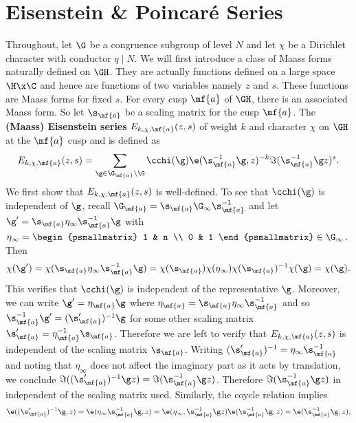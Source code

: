   \section{Eisenstein \& Poincar\'e Series}
    Throughout, let $\G$ be a congruence subgroup of level $N$ and let $\chi$ be a Dirichlet character with conductor $q \mid N$. We will first introduce a class of Maass forms naturally defined on $\GH$. They are actually functions defined on a large space $\H \x \C$ and hence are functions of two variables namely $z$ and $s$. These functions are Maass forms for fixed $s$. For every cusp $\mf{a}$ of $\GH$, there is an associated Maass form. So let $\s_{\mf{a}}$ be a scaling matrix for the cusp $\mf{a}$. The \textbf{(Maass) Eisenstein series} $E_{k,\chi,\mf{a}}(z,s)$ of weight $k$ and character $\chi$ on $\GH$ at the $\mf{a}$ cusp and is defined as
    \[
      E_{k,\chi,\mf{a}}(z,s) = \sum_{\g \in \G_{\mf{a}}\backslash\G}\cchi(\g)\e(\s_{\mf{a}}^{-1}\g,z)^{-k}\Im(\s_{\mf{a}}^{-1}\g z)^{s}.
    \]
    We first show that $E_{k,\chi,\mf{a}}(z,s)$ is well-defined. To see that $\cchi(\g)$ is independent of $\g$, recall $\G_{\mf{a}} = \s_{\mf{a}}\G_{\infty}\s_{\mf{a}}^{-1}$ and let $\g' = \s_{\mf{a}}\eta_{\infty}\s_{\mf{a}}^{-1}\g$ with $\eta_{\infty} = \begin{psmallmatrix} 1 & n \\ 0 & 1 \end{psmallmatrix} \in \G_{\infty}$. Then
    \[
      \chi(\g') = \chi(\s_{\mf{a}}\eta_{\infty}\s_{\mf{a}}^{-1}\g) = \chi(\s_{\mf{a}})\chi(\eta_{\infty})\chi(\s_{\mf{a}})^{-1}\chi(\g) = \chi(\g).
    \]
    This verifies that $\cchi(\g)$ is independent of the representative $\g$. Moreover, we can write $\g' = \eta_{\mf{a}}\g$ where $\eta_{\mf{a}} = \s_{\mf{a}}\eta_{\infty}\s_{\mf{a}}^{-1}$ and so $\s_{\mf{a}}^{-1}\g' = (\s_{\mf{a}}')^{-1}\g$ for some other scaling matrix $\s_{\mf{a}}' = \eta_{\mf{a}}^{-1}\s_{\mf{a}}$. Therefore we are left to verify that $E_{k,\chi,\mf{a}}(z,s)$ is independent of the scaling matrix $\s_{\mf{a}}$. Writing $(\s_{\mf{a}}')^{-1} = \eta_{\infty}\s_{\mf{a}}^{-1}$ and noting that $\eta_{\infty}$ does not affect the imaginary part as it acts by translation, we conclude $\Im((\s_{\mf{a}}')^{-1}\g z) = \Im(\s_{\mf{a}}^{-1}\g z)$. Therefore $\Im(\s_{\mf{a}}^{-1}\g z)$ in independent of the scaling matrix used. Similarly, the coycle relation implies
    \[
      \e((\s_{\mf{a}}')^{-1}\g,z) = \e(\eta_{\infty}\s_{\mf{a}}^{-1}\g,z) = \e(\eta_{\infty},\s_{\mf{a}}^{-1}\g z)\e(\s_{\mf{a}}^{-1}\g,z) = \e(\s_{\mf{a}}^{-1}\g,z),
    \]
